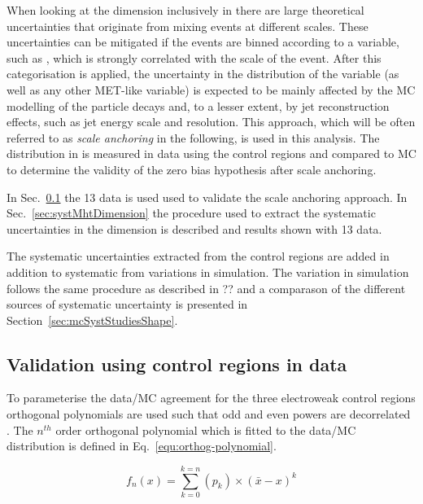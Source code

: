When looking at the \mht dimension inclusively in \scalht there are
large theoretical uncertainties that originate from mixing events
at different scales. These uncertainties can be mitigated if the events 
are binned according to a variable, such as \scalht, 
which is strongly correlated with the scale of the event. 
After this categorisation is applied, the uncertainty in 
the distribution of the \mht variable
(as well as any other MET-like variable) is expected to be 
mainly affected by the MC modelling of the particle 
decays and, to a lesser extent, by jet reconstruction effects, 
such as jet energy scale and resolution. 
This approach, which will be often referred to as \textit{scale anchoring}
in the following, is used in this analysis. The distribution in \mht
is measured in data using the control regions and compared to MC
to determine the validity of the zero bias hypothesis after scale anchoring.

In Sec.~\ref{sec:valid13} the 13 \TeV data is used used 
to validate the scale anchoring approach. 
In Sec.~\ref{sec:systMhtDimension} 
the procedure used to extract the systematic uncertainties in the 
\mht dimension is described and results shown with 13 \TeV data. 

The systematic uncertainties extracted from the control regions
are added in addition to systematic from variations in simulation.
The variation in simulation follows the same procedure as described in
?? and a comparason of the different sources of systematic uncertainty
is presented in Section~\ref{sec:mcSystStudiesShape}.

\subsection{Validation using control regions in data}
\label{sec:valid13}
To parameterise the data/MC agreement
for the three electroweak control regions
orthogonal polynomials are used such that odd and even powers 
are decorrelated \cite{cohen2013applied}. 
The $n^{th}$ order orthogonal polynomial which is fitted to the data/MC 
distribution is defined in Eq.~\ref{equ:orthog-polynomial}.

\begin{equation}
  \label{equ:orthog-polynomial}
  f_n(x) = \sum_{k=0}^{k=n}{(p_k)\times(\bar{x}-x)^k}
\end{equation}

